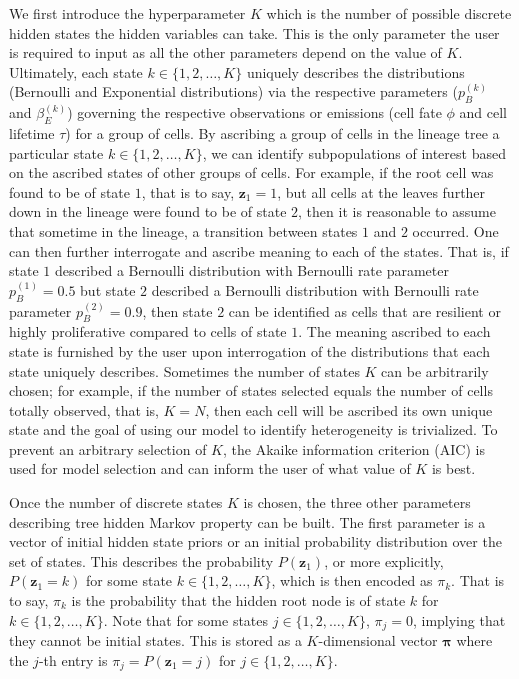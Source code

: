 \documentclass[11pt]{article}
\begin{document}
We first introduce the hyperparameter \(K\) which is the number of
possible discrete hidden states the hidden variables can take. This is
the only parameter the user is required to input as all the other
parameters depend on the value of \(K\). Ultimately, each state
\(k\in\{1,2,\ldots,K\}\) uniquely describes the distributions (Bernoulli
and Exponential distributions) via the respective parameters
(\(p_{B}^{(k)}\) and \(\beta_{E}^{(k)}\)) governing the respective
observations or emissions (cell fate \(\phi\) and cell lifetime
\(\tau\)) for a group of cells. By ascribing a group of cells in the
lineage tree a particular state \(k\in\{1,2,\ldots,K\}\), we can
identify subpopulations of interest based on the ascribed states of
other groups of cells. For example, if the root cell was found to be of
state \(1\), that is to say, \(\bm{z}_{1}=1\), but all cells at the
leaves further down in the lineage were found to be of state \(2\), then
it is reasonable to assume that sometime in the lineage, a transition
between states \(1\) and \(2\) occurred. One can then further
interrogate and ascribe meaning to each of the states. That is, if state
\(1\) described a Bernoulli distribution with Bernoulli rate parameter
\(p_{B}^{(1)}=0.5\) but state \(2\) described a Bernoulli distribution
with Bernoulli rate parameter \(p_{B}^{(2)}=0.9\), then state \(2\) can
be identified as cells that are resilient or highly proliferative
compared to cells of state \(1\). The meaning ascribed to each state is
furnished by the user upon interrogation of the distributions that each
state uniquely describes. Sometimes the number of states \(K\) can be
arbitrarily chosen; for example, if the number of states selected equals
the number of cells totally observed, that is, \(K=N\), then each cell
will be ascribed its own unique state and the goal of using our model to
identify heterogeneity is trivialized. To prevent an arbitrary selection
of \(K\), the Akaike information criterion (AIC) is used for model
selection and can inform the user of what value of \(K\) is best.

Once the number of discrete states \(K\) is chosen, the three other
parameters describing tree hidden Markov property can be built. The
first parameter is a vector of initial hidden state priors or an initial
probability distribution over the set of states. This describes the
probability \(P(\bm{z}_{1})\), or more explicitly, \(P(\bm{z}_{1}=k)\)
for some state \(k\in\{1,2,\ldots,K\}\), which is then encoded as
\(\pi_{k}\). That is to say, \(\pi_{k}\) is the probability that the
hidden root node is of state \(k\) for \(k\in\{1,2,\ldots,K\}\). Note
that for some states \(j\in\{1,2,\ldots,K\}\), \(\pi_{j}=0\), implying
that they cannot be initial states. This is stored as a
\(K\)-dimensional vector \(\bm{\pi}\) where the \(j\)-th entry is
\(\pi_{j}=P(\bm{z}_{1}=j)\) for \(j\in\{1,2,\ldots,K\}\).
\end{document}
